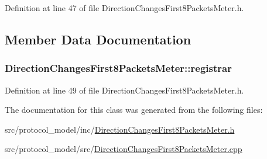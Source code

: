 Definition at line 47 of file Direction\-Changes\-First8\-Packets\-Meter.\-h.



\subsection{Member Data Documentation}
\hypertarget{class_vsid_1_1_direction_changes_first8_packets_meter_ada5677211397c9ef8177e2f5d7e8fa26}{
\subsubsection[{registrar}]{ Direction\-Changes\-First8\-Packets\-Meter\-::registrar\hspace{0.3cm}{\ttfamily [static]}}}\label{class_vsid_1_1_direction_changes_first8_packets_meter_ada5677211397c9ef8177e2f5d7e8fa26}


Definition at line 49 of file Direction\-Changes\-First8\-Packets\-Meter.\-h.



The documentation for this class was generated from the following files\-:\begin{DoxyCompactItemize}
\item 
src/protocol\-\_\-model/inc/\hyperlink{_direction_changes_first8_packets_meter_8h}{Direction\-Changes\-First8\-Packets\-Meter.\-h}\item 
src/protocol\-\_\-model/src/\hyperlink{_direction_changes_first8_packets_meter_8cpp}{Direction\-Changes\-First8\-Packets\-Meter.\-cpp}\end{DoxyCompactItemize}

